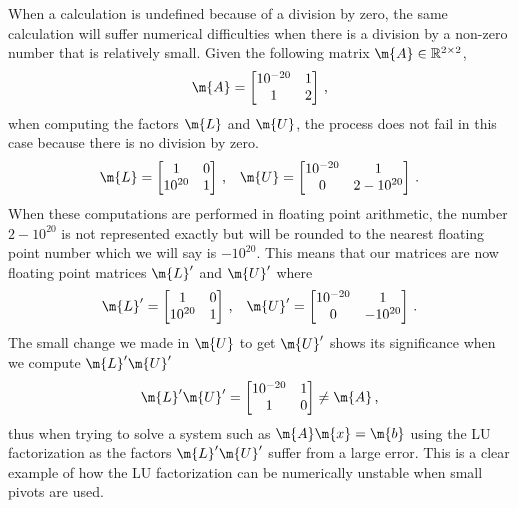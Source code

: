 \begin{example}
  When a calculation is undefined because of a division by zero, the same calculation will suffer numerical difficulties when there is a division by a non-zero number that is relatively small. Given the following matrix $\m{A} \in \mathbb{R}^{2 \times 2}$,
  \begin{equation*}
    \m{A} = \begin{bmatrix}
      10^{-20} & 1 \\
      1 & 2
    \end{bmatrix} \, \text{,}
  \end{equation*}
  when computing the factors $\m{L}$ and $\m{U}$, the process does not fail in this case because there is no division by zero.
  \begin{equation*}
    \m{L} = \begin{bmatrix}
      1 & 0 \\
      10^{20} & 1
    \end{bmatrix} \, \text{,} \quad \m{U} = \begin{bmatrix}
      10^{-20} & 1 \\
      0 & 2 - 10^{20}
    \end{bmatrix} \, \text{.}
  \end{equation*}
  When these computations are performed in floating point arithmetic, the number $2 - 10^{20}$ is not represented exactly but will be rounded to the nearest floating point number which we will say is $-10^{20}$. This means that our matrices are now floating point matrices $\m{L}^\prime$ and $\m{U}^\prime$ where
  \begin{equation*}
    \m{L}^\prime = \begin{bmatrix}
      1 & 0 \\
      10^{20} & 1
    \end{bmatrix} \, \text{,} \quad \m{U}^\prime = \begin{bmatrix}
      10^{-20} & 1 \\
      0 & -10^{20}
    \end{bmatrix} \, \text{.}
  \end{equation*}
  The small change we made in $\m{U}$ to get $\m{U}^\prime$ shows its significance when we compute $\m{L}^\prime\m{U}^\prime$
  \begin{equation*}
    \m{L}^\prime\m{U}^\prime = \begin{bmatrix}
      10^{-20} & 1 \\
      1 & 0
    \end{bmatrix} \neq \m{A} \, \text{,}
  \end{equation*}
  thus when trying to solve a system such as $\m{A}\m{x} = \m{b}$ using the \ac{LU} factorization as the factors $\m{L}^\prime\m{U}^\prime$ suffer from a large error. This is a clear example of how the \ac{LU} factorization can be numerically unstable when small pivots are used.
\end{example}

